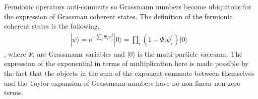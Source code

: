 \documentclass[notitlepage,onecolumn,showpacs,11pt]{revtex4-1}
\begin{document}
Fermionic operators anti-commute so Grassmann numbers become ubiquitous for the expression 
of Grassman coherent states. The definition of the fermionic coherent states is the
following,
\begin{equation}
	\begin{aligned}
		|\psi\rangle=\text{e}^{-\sum_{i}\Psi_i\psi^\dagger_i}|0\rangle
		=\prod_i\left(1-\Psi_i\psi^\dagger_i\right)|0\rangle
	\end{aligned}
\end{equation}
, where $\Psi_i$ are Grassmann variables and $|0\rangle$ is the multi-particle vaccuam. 
The expression of the exponential in terms of multiplication here is made possible by 
the fact that the objects in the sum of the exponent commute between themselves and the 
Taylor expansion of Grassmann numbers have no non-linear non-zero terms.
\end{document}
